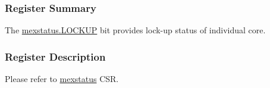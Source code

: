 \documentclass[main\_\_EN.tex]{subfiles}
\begin{document}
\subsubsection{Register Summary}
\label{sec:riscvcpu-custom-lockup-reg-summ}

The \hyperref[fielddesc:MEXSTATUS_LOCKUP]{mexstatus.LOCKUP} bit provides lock-up status of individual core.

\subsubsection{Register Description}
\label{sec:riscvcpu-custom-lockup-reg-desc}
Please refer to \hyperref[regdesc:MEXSTATUS]{mexstatus} CSR.
\end{document}
